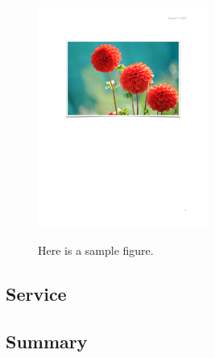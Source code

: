 %
\begin{figure}[H]
\caption{Here is a sample figure.}
\centering
\includegraphics[width=0.5\textwidth]{Files/4_Qualitative_Assessment/Fig.pdf}
\label{fig_label}
\end{figure}




\subsection{Service}
\blindtext


\subsection{Summary}
\blindtext
